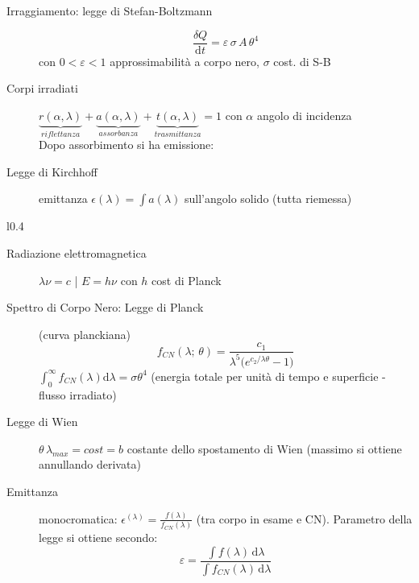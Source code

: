 \documentclass[10pt, oneside]{article}
\begin{document}
\begin{description}
\item[\large Irraggiamento: legge di Stefan-Boltzmann]
\[\boxed{\frac{\delta Q}{\mathrm{d}t} = \varepsilon \, \sigma \, A \, \theta^4}\]
con $0<\varepsilon<1$ approssimabilità a corpo nero, $\sigma$ cost. di S-B
\item[Corpi irradiati] $\displaystyle \underbrace{r(\alpha, \lambda)}_{riflettanza} + \underbrace{a(\alpha, \lambda)}_{assorbanza} + \underbrace{t(\alpha, \lambda)}_{trasmittanza} = 1$ con $\alpha$ angolo di incidenza
\\Dopo assorbimento si ha emissione:
\item[Legge di Kirchhoff] emittanza $\displaystyle \epsilon(\lambda) = \int a(\lambda)$ sull'angolo solido (tutta riemessa)
\end{description}

\begin{wrapfigure}{l}{0.4\textwidth}
\centering
{}
\vspace{-2.6cm}
\end{wrapfigure}
\noindent 
\begin{description}
\item[Radiazione elettromagnetica] $\displaystyle \lambda \nu = c$ \bigg| $\displaystyle E = h \nu$ con $h$ cost di Planck
\item[Spettro di Corpo Nero: Legge di Planck] (curva planckiana)
\[\boxed{f_{CN}(\lambda; \, \theta) = \frac{c_1}{\lambda^5 \big(\displaystyle e^{c_2 / \lambda \theta} - 1 \big)}}\]
$\displaystyle \int_{0}^{\infty}f_{CN}(\lambda) \mathrm{d}\lambda = \sigma \theta^4$ (energia totale per unità di tempo e superficie - flusso irradiato)
\item[Legge di Wien] $\displaystyle \theta \, \lambda_{max} = cost = b$ costante dello spostamento di Wien (massimo si ottiene annullando derivata)
\end{description}

\begin{description}
\item[Emittanza] monocromatica: $\displaystyle \epsilon^{(\lambda)} = \frac{f(\lambda)}{f_{CN}(\lambda)}$ (tra corpo in esame e CN). Parametro della legge si ottiene secondo:
\[\varepsilon = \frac{\int f(\lambda)\, \mathrm{d}\lambda}{\int f_{CN}(\lambda)\, \mathrm{d}\lambda}\]

\end{description}
\end{document}
